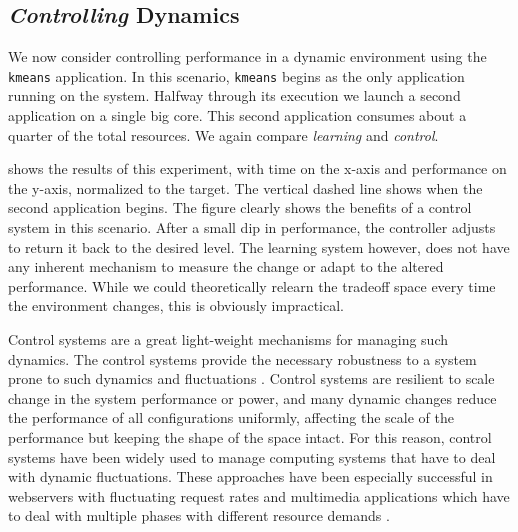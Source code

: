 
\subsection{\emph{Controlling} Dynamics}
We now consider controlling performance in a dynamic environment using
the \texttt{kmeans} application.  In this scenario, \texttt{kmeans}
begins as the only application running on the system.  Halfway through
its execution we launch a second application on a single big core.
This second application consumes about a quarter of the total
resources.  We again compare \emph{learning} and \emph{control}.


 shows the results of this experiment, with
time on the x-axis and performance on the y-axis, normalized to the
target.  The vertical dashed line shows when the second application
begins.  The figure clearly shows the benefits of a control system in
this scenario.  After a small dip in performance, the controller
adjusts to return it back to the desired level.  The learning system
however, does not have any inherent mechanism to measure the change or
adapt to the altered performance.  While we could theoretically
relearn the tradeoff space every time the environment changes, this is
obviously impractical.  

Control systems are a great light-weight mechanisms for managing such
dynamics. The control systems provide the necessary robustness to a
system prone to such dynamics and fluctuations
\cite{Hellerstein2004a}. Control systems are resilient to scale change
in the system performance or power, and many dynamic changes reduce
the performance of all configurations uniformly, affecting the scale
of the performance but keeping the shape of the space intact.  For
this reason, control systems have been widely used to manage computing
systems that have to deal with dynamic fluctuations.  These approaches
have been especially successful in webservers with fluctuating request
rates \cite{Horvarth,LuEtAl-2006a,SunDaiPan-2008a} and multimedia
applications which have to deal with multiple phases with different
resource demands \cite{TCST,Agilos,grace2}.


